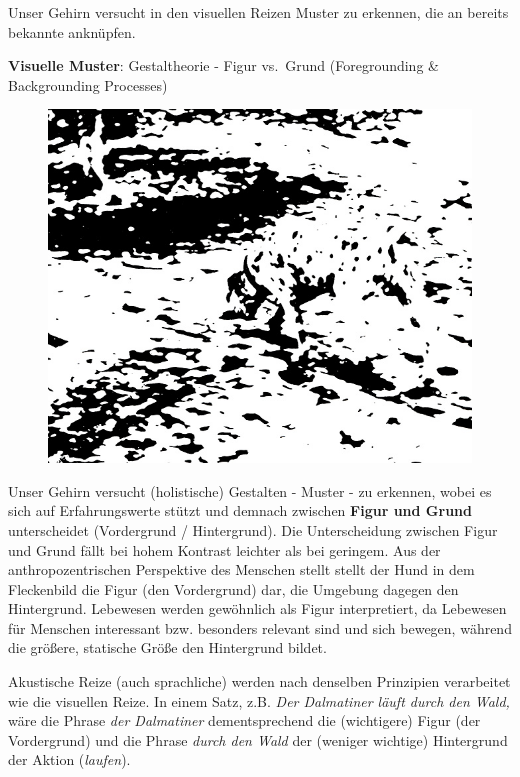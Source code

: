 \documentclass[
  letterpaper,
]{scrbook}
\begin{document}
Unser Gehirn versucht in den visuellen Reizen Muster zu erkennen, die an
bereits bekannte anknüpfen.

\textbf{Visuelle Muster}: Gestaltheorie - Figur vs.~Grund (Foregrounding
\& Backgrounding Processes)

\begin{figure}

{\centering 

\href{https://bildnerisches-gestalten.ch/index.php/wahrnehmung/}{\includegraphics[width=1\textwidth,height=\textheight]{./pictures/dalmatiner.jpg}}

}

\end{figure}

Unser Gehirn versucht (holistische) Gestalten - Muster - zu erkennen,
wobei es sich auf Erfahrungswerte stützt und demnach zwischen
\textbf{Figur und Grund} unterscheidet (Vordergrund / Hintergrund). Die
Unterscheidung zwischen Figur und Grund fällt bei hohem Kontrast
leichter als bei geringem. Aus der anthropozentrischen Perspektive des
Menschen stellt stellt der Hund in dem Fleckenbild die Figur (den
Vordergrund) dar, die Umgebung dagegen den Hintergrund. Lebewesen werden
gewöhnlich als Figur interpretiert, da Lebewesen für Menschen
interessant bzw. besonders relevant sind und sich bewegen, während die
größere, statische Größe den Hintergrund bildet.

Akustische Reize (auch sprachliche) werden nach denselben Prinzipien
verarbeitet wie die visuellen Reize. In einem Satz, z.B. \emph{Der
Dalmatiner läuft durch den Wald,} wäre die Phrase \emph{der Dalmatiner}
dementsprechend die (wichtigere) Figur (der Vordergrund) und die Phrase
\emph{durch den Wald} der (weniger wichtige) Hintergrund der Aktion
(\emph{laufen}).
\end{document}
